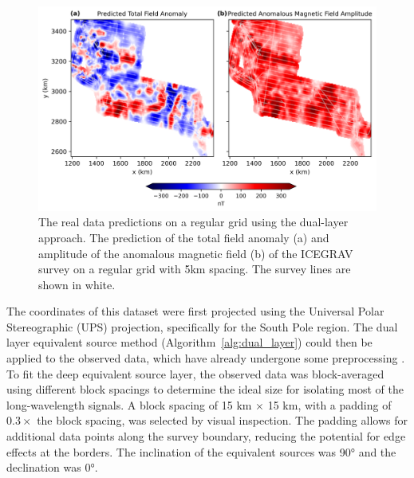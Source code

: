 \begin{figure}[tb!]
\centering
\includegraphics[width=1\linewidth]{figures/real_grid_pred.png}
\caption{
    The real data predictions on a regular grid using the dual-layer approach. The prediction of the total field anomaly (a) and amplitude of the anomalous magnetic field (b) of the ICEGRAV survey \citep{ICEGRAV_data} on a regular grid with 5km spacing. The survey lines are shown in white.
}
\label{fig:real_grid_pred}
\end{figure}

The coordinates of this dataset were first projected using the Universal Polar Stereographic (UPS) projection, specifically for the South Pole region. The dual layer equivalent source method (Algorithm~\ref{alg:dual_layer}) could then be applied to the observed data, which have already undergone some preprocessing \citep{ICEGRAV_data}. To fit the deep equivalent source layer, the observed data was block-averaged using different block spacings to determine the ideal size for isolating most of the long-wavelength signals. A block spacing of 15 km $\times$ 15 km, with a padding of $ 0.3 \times $ the block spacing, was selected by visual inspection. The padding allows for additional data points along the survey boundary, reducing the potential for edge effects at the borders. 
The inclination of the equivalent sources was \ang{90} and the declination was \ang{0}.

